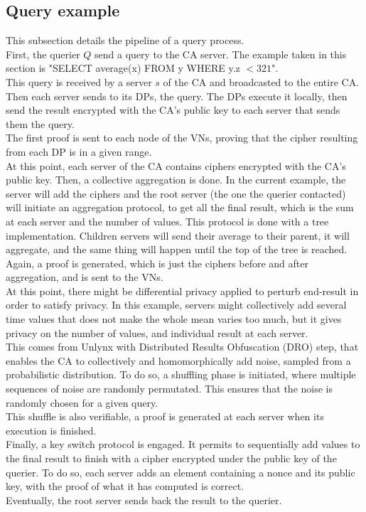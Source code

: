 \documentclass{article}
\begin{document}
\subsection{Query example}
This subsection details the pipeline of a query process.\\
First, the querier $Q$ send a query to the CA server. The example taken in this section is "SELECT average(x) FROM y WHERE y.z $< 321$".\\
This query is received by a server $s$ of the CA and broadcasted to the entire CA. Then each server sends to its DPs, the query. The DPs execute it locally, then send the result encrypted with the CA's public key to each server that sends them the query.\\
The first proof is sent to each node of the VNs, proving that the cipher resulting from each DP is in a given range.\\
At this point, each server of the CA contains ciphers encrypted with the CA's public key.
Then, a collective aggregation is done. In the current example, the server will add the ciphers and the root server (the one the querier contacted) will initiate an aggregation protocol, to get all the final result, which is the sum at each server and the number of values. This protocol is done with a tree implementation. Children servers will send their average to their parent, it will aggregate, and the same thing will happen until the top of the tree is reached.\\
Again, a proof is generated, which is just the ciphers before and after aggregation, and is sent to the VNs.\\
At this point, there might be differential privacy applied to perturb end-result in order to satisfy privacy. In this example, servers might collectively add several time values that does not make the whole mean varies too much, but it gives privacy on the number of values, and individual result at each server.\\
This comes from Unlynx with Distributed Results Obfuscation (DRO) step, that enables the CA to collectively and homomorphically add noise, sampled from a probabilistic distribution.
To do so, a shuffling phase is initiated, where multiple sequences of noise are randomly permutated. This ensures that the noise is randomly chosen for a given query.\\
This shuffle is also verifiable, a proof is generated at each server when its execution is finished.\\
Finally, a key switch protocol is engaged. It permits to sequentially add values to the final result to finish with a cipher encrypted under the public key of the querier. To do so, each server adds an element containing a nonce and its public key, with the proof of what it has computed is correct.\\
Eventually, the root server sends back the result to the querier.\\
\end{document}
